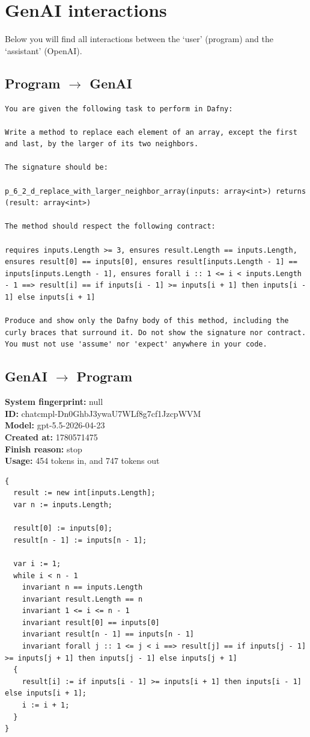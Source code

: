 \documentclass{article}
\begin{document}
\section*{GenAI interactions}
Below you will find all interactions between the `user' (program) and the `assistant' (OpenAI).
\subsection*{Program $\rightarrow$ GenAI}
\begin{lstlisting}
You are given the following task to perform in Dafny:

Write a method to replace each element of an array, except the first and last, by the larger of its two neighbors.

The signature should be:

p_6_2_d_replace_with_larger_neighbor_array(inputs: array<int>) returns (result: array<int>)

The method should respect the following contract:

requires inputs.Length >= 3, ensures result.Length == inputs.Length, ensures result[0] == inputs[0], ensures result[inputs.Length - 1] == inputs[inputs.Length - 1], ensures forall i :: 1 <= i < inputs.Length - 1 ==> result[i] == if inputs[i - 1] >= inputs[i + 1] then inputs[i - 1] else inputs[i + 1]

Produce and show only the Dafny body of this method, including the curly braces that surround it. Do not show the signature nor contract. You must not use 'assume' nor 'expect' anywhere in your code.
\end{lstlisting}
\subsection*{GenAI $\rightarrow$ Program}
\textbf{System fingerprint: }null
\\\textbf{ID: }chatcmpl-Dn0GhbJ3ywaU7WLf8g7cf1JzcpWVM
\\\textbf{Model: }gpt-5.5-2026-04-23
\\\textbf{Created at: }1780571475
\\\textbf{Finish reason: }stop
\\\textbf{Usage: }454 tokens in, and 747 tokens out
\begin{lstlisting}
{
  result := new int[inputs.Length];
  var n := inputs.Length;

  result[0] := inputs[0];
  result[n - 1] := inputs[n - 1];

  var i := 1;
  while i < n - 1
    invariant n == inputs.Length
    invariant result.Length == n
    invariant 1 <= i <= n - 1
    invariant result[0] == inputs[0]
    invariant result[n - 1] == inputs[n - 1]
    invariant forall j :: 1 <= j < i ==> result[j] == if inputs[j - 1] >= inputs[j + 1] then inputs[j - 1] else inputs[j + 1]
  {
    result[i] := if inputs[i - 1] >= inputs[i + 1] then inputs[i - 1] else inputs[i + 1];
    i := i + 1;
  }
}
\end{lstlisting}
\end{document}
